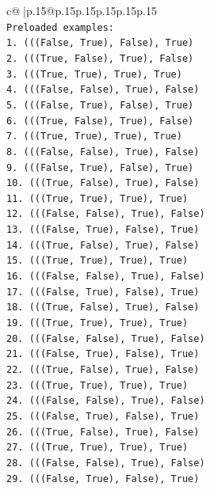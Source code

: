 \documentclass{article}
\begin{document}
{\begin{supertabular}{c@{$\;$}|p{.15\linewidth}@{}p{.15\linewidth}p{.15\linewidth}p{.15\linewidth}p{.15\linewidth}p{.15\linewidth}}
{{{\\ 
\texttt{Preloaded examples:} \\
\texttt{1. (((False, True), False), True)} \\
\texttt{2. (((True, False), True), False)} \\
\texttt{3. (((True, True), True), True)} \\
\texttt{4. (((False, False), True), False)} \\
\texttt{5. (((False, True), False), True)} \\
\texttt{6. (((True, False), True), False)} \\
\texttt{7. (((True, True), True), True)} \\
\texttt{8. (((False, False), True), False)} \\
\texttt{9. (((False, True), False), True)} \\
\texttt{10. (((True, False), True), False)} \\
\texttt{11. (((True, True), True), True)} \\
\texttt{12. (((False, False), True), False)} \\
\texttt{13. (((False, True), False), True)} \\
\texttt{14. (((True, False), True), False)} \\
\texttt{15. (((True, True), True), True)} \\
\texttt{16. (((False, False), True), False)} \\
\texttt{17. (((False, True), False), True)} \\
\texttt{18. (((True, False), True), False)} \\
\texttt{19. (((True, True), True), True)} \\
\texttt{20. (((False, False), True), False)} \\
\texttt{21. (((False, True), False), True)} \\
\texttt{22. (((True, False), True), False)} \\
\texttt{23. (((True, True), True), True)} \\
\texttt{24. (((False, False), True), False)} \\
\texttt{25. (((False, True), False), True)} \\
\texttt{26. (((True, False), True), False)} \\
\texttt{27. (((True, True), True), True)} \\
\texttt{28. (((False, False), True), False)} \\
\texttt{29. (((False, True), False), True)} \\
}}}
\end{supertabular}}
\end{document}
